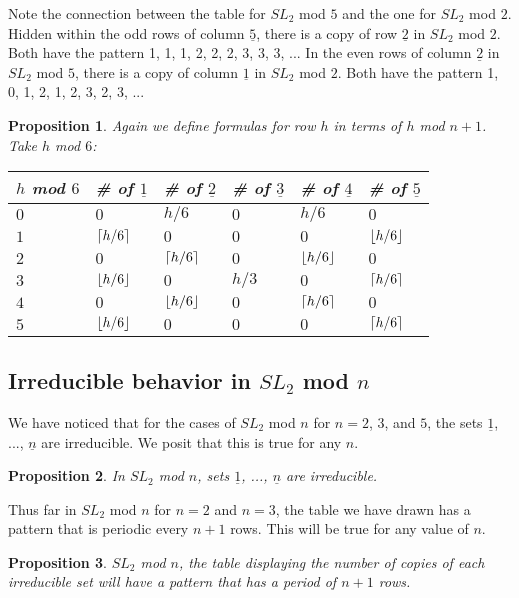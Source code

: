 \documentclass[a4paper,draft]{amsproc}
\DeclarePairedDelimiter{\ceil}{\lceil}{\rceil}
\DeclarePairedDelimiter{\floor}{\lfloor}{\rfloor}
\theoremstyle{plain}
\newtheorem{prop}{Proposition}[section]
\theoremstyle{definition}
\theoremstyle{remark}
\numberwithin{equation}{section}
\begin{document}
Note the connection between the table for $SL_{2}$ mod $5$ and the one for $SL_{2}$ mod $2$. Hidden within the odd rows of column $\underline{5}$, there is a copy of row $\underline{2}$ in $SL_{2}$ mod $2$. Both have the pattern 1, 1, 1, 2, 2, 2, 3, 3, 3, ... In the even rows of column $\underline{2}$ in $SL_{2}$ mod $5$, there is a copy of column $\underline{1}$ in $SL_{2}$ mod $2$. Both have the pattern 1, 0, 1, 2, 1, 2, 3, 2, 3, ...

\begin{prop}
Again we define formulas for row $h$ in terms of $h$ mod $n + 1$. Take $h$ mod $6$: \\
\begin{table}[h]
\centering
    \begin{tabular}{|l|l|l|l|l|l|}
    \hline
    $h$ mod $6$ & \# of $\underline{1}$ & \# of $\underline{2}$ & \# of $\underline{3}$ & \# of $\underline{4}$ & \# of $\underline{5} $\\ \hline
    $0$  & $0$     & $h/6$  & $0$ &  $h/6$ & $0$  \\ \hline
    $1$  & $\ceil*{h/6}$     & $0$  & $0$ &  $0$ & $\floor*{h/6}$  \\ \hline
    $2$ & $0$     & $\ceil*{h/6}$  & $0$ & $\floor*{h/6}$ & $0$  \\ \hline
    $3$ & $\floor*{h/6}$  & $0$  & $h/3$ &  $0$ & $\ceil*{h/6}$  \\ \hline
    $4$ & $0$     & $\floor*{h/6}$  & $0$ & $\ceil*{h/6}$ & $0$  \\ \hline
    $5$ & $\floor*{h/6}$  & $0$  & $0$ &  $0$ & $\ceil*{h/6}$  \\ \hline
    \end{tabular}
\end{table}

\end{prop}

\subsection{Irreducible behavior in $SL_{2}$ mod $n$}
We have noticed that for the cases of $SL_{2}$ mod $n$ for $n = 2$, $3$, and $5$, the sets $\underline{1}$, ..., $\underline{n}$ are irreducible. We posit that this is true for any $n$. 
\begin{prop}
 In $SL_{2}$ mod $n$, sets $\underline{1}$, ..., $\underline{n}$ are irreducible. 
\end{prop}

Thus far in $SL_{2}$ mod $n$ for $n = 2$ and $n = 3$, the table we have drawn has a pattern that is periodic every $n + 1$ rows. This will be true for any value of $n$. 
\begin{prop}
$SL_{2}$ mod $n$, the table displaying the number of copies of each irreducible set will have a pattern that has a period of $n + 1$  rows. 
\end{prop}
\end{document}
